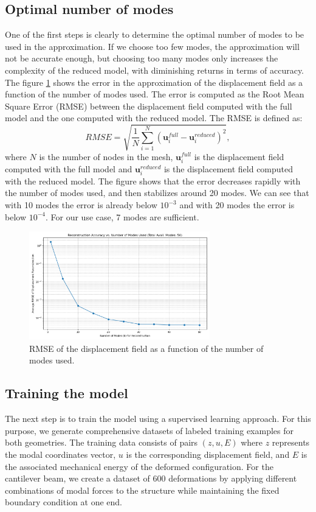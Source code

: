 \subsection{Optimal number of modes}
\label{sec:optimal_number_modes}
One of the first steps is clearly to determine the optimal number of modes to be used in the approximation. If we choose too few modes, the approximation will not be accurate enough, but choosing too many modes only increases the complexity of the reduced model, with diminishing returns in terms of accuracy. The figure \ref{fig:optimal_number_modes} shows the error in the approximation of the displacement field as a function of the number of modes used. The error is computed as the Root Mean Square Error (RMSE) between the displacement field computed with the full model and the one computed with the reduced model. The RMSE is defined as:
\begin{equation}
    RMSE = \sqrt{\frac{1}{N}\sum_{i=1}^N (\bm{u}_i^{full} - \bm{u}_i^{reduced})^2},
\end{equation}
where $N$ is the number of nodes in the mesh, $\bm{u}_i^{full}$ is the displacement field computed with the full model and $\bm{u}_i^{reduced}$ is the displacement field computed with the reduced model. The figure shows that the error decreases rapidly with the number of modes used, and then stabilizes around 20 modes. We can see that with 10 modes the error is already below \(10^{-3}\) and with 20 modes the error is below \(10^{-4}\). For our use case, 7 modes are sufficient.
\begin{figure}[ht]
    \centering
    \includegraphics[width=0.7\textwidth]{Images/rmse_vs_modes.png}
    \caption{RMSE of the displacement field as a function of the number of modes used.}
    \label{fig:optimal_number_modes}
\end{figure}

\subsection{Training the model}
\label{sec:training_model}
The next step is to train the model using a supervised learning approach. For this purpose, we generate comprehensive datasets of labeled training examples for both geometries. The training data consists of pairs $(z, u, E)$ where $z$ represents the modal coordinates vector, $u$ is the corresponding displacement field, and $E$ is the associated mechanical energy of the deformed configuration.
For the cantilever beam, we create a dataset of 600 deformations by applying different combinations of modal forces to the structure while maintaining the fixed boundary condition at one end. 


